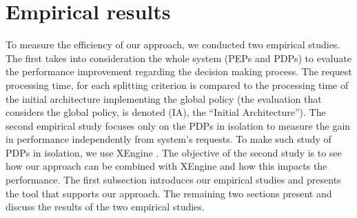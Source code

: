 \section{Empirical results} \label{sec:experiment}
To measure the efficiency of our approach, we conducted two empirical studies. The first takes into consideration the whole system 
(PEPs and PDPs) to evaluate the performance improvement regarding the decision making process. The request processing time, 
for each splitting criterion is compared to the processing time of the initial architecture implementing the global policy (the evaluation 
that considers the global policy, is denoted (IA), the ``Initial Architecture''). The second empirical study focuses only on the PDPs in isolation to measure the gain in performance
 independently from system's requests. To make such study of PDPs in isolation, we use XEngine \cite{Xengine}. The objective of the second study is to see how our approach can be 
combined with XEngine and how this impacts the performance. The first subsection introduces our empirical studies and presents the tool that supports our approach. The remaining two 
sections present and discuss the results of the two empirical studies.  

